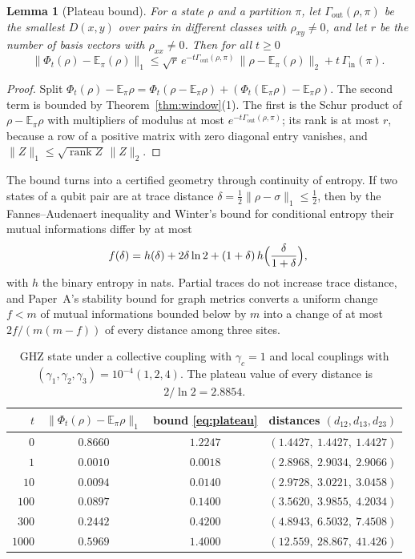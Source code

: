 \documentclass[12pt,a4paper]{article}
\newtheorem{lemma}[theorem]{Lemma}
\newcommand{\E}{\mathbb E}
\newcommand{\Gin}{\Gamma_{\mathrm{in}}}
\newcommand{\Gout}{\Gamma_{\mathrm{out}}}
\begin{document}
\begin{lemma}[Plateau bound]
\label{lem:plateau}
For a state $\rho$ and a partition $\pi$, let $\Gout(\rho,\pi)$ be the smallest $D(x,y)$ over pairs in different classes with $\rho_{xy}\ne0$, and let $r$ be the number of basis vectors with $\rho_{xx}\ne0$. Then for all $t\ge0$
\begin{equation}
\|\Phi_t(\rho)-\E_\pi(\rho)\|_1\le\sqrt r\,e^{-t\Gout(\rho,\pi)}\,\|\rho-\E_\pi(\rho)\|_2+t\,\Gin(\pi).
\label{eq:plateau}
\end{equation}
\end{lemma}

\begin{proof}
Split $\Phi_t(\rho)-\E_\pi\rho=\Phi_t(\rho-\E_\pi\rho)+(\Phi_t(\E_\pi\rho)-\E_\pi\rho)$. The second term is bounded by Theorem~\ref{thm:window}(1). The first is the Schur product of $\rho-\E_\pi\rho$ with multipliers of modulus at most $e^{-t\Gout(\rho,\pi)}$; its rank is at most $r$, because a row of a positive matrix with zero diagonal entry vanishes, and $\|Z\|_1\le\sqrt{\operatorname{rank}Z}\,\|Z\|_2$.
\end{proof}

The bound turns into a certified geometry through continuity of entropy. If two states of a qubit pair are at trace distance $\delta=\tfrac12\|\rho-\sigma\|_1\le\frac12$, then by the Fannes--Audenaert inequality \cite{Audenaert2007} and Winter's bound for conditional entropy \cite{Winter2016} their mutual informations differ by at most
\begin{equation}
f(\delta)=h(\delta)+2\delta\ln2+(1+\delta)\,h\Bigl(\frac{\delta}{1+\delta}\Bigr),
\label{eq:fdelta}
\end{equation}
with $h$ the binary entropy in nats. Partial traces do not increase trace distance, and Paper~A's stability bound for graph metrics converts a uniform change $f<m$ of mutual informations bounded below by $m$ into a change of at most $2f/(m(m-f))$ of every distance among three sites.

\begin{table}[ht]
\centering
\begin{tabular}{rccc}
\toprule
$t$ & $\|\Phi_t(\rho)-\E_\pi\rho\|_1$ & bound \eqref{eq:plateau} & distances $(d_{12},d_{13},d_{23})$\\
\midrule
$0$ & $0.8660$ & $1.2247$ & $(1.4427,\ 1.4427,\ 1.4427)$\\
$1$ & $0.0010$ & $0.0018$ & $(2.8968,\ 2.9034,\ 2.9066)$\\
$10$ & $0.0094$ & $0.0140$ & $(2.9728,\ 3.0221,\ 3.0458)$\\
$100$ & $0.0897$ & $0.1400$ & $(3.5620,\ 3.9855,\ 4.2034)$\\
$300$ & $0.2442$ & $0.4200$ & $(4.8943,\ 6.5032,\ 7.4508)$\\
$1000$ & $0.5969$ & $1.4000$ & $(12.559,\ 28.867,\ 41.426)$\\
\bottomrule
\end{tabular}
\caption{GHZ state under a collective coupling with $\gamma_c=1$ and local couplings with $(\gamma_1,\gamma_2,\gamma_3)=10^{-4}(1,2,4)$. The plateau value of every distance is $2/\ln2=2.8854$.}
\label{tab:plateau}
\end{table}
\end{document}
